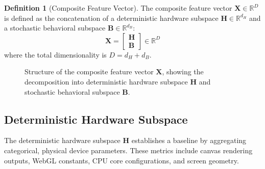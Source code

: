 \documentclass[11pt,twoside]{amsart}
\theoremstyle{plain}
\theoremstyle{definition}
\newtheorem{definition}[theorem]{Definition}
\theoremstyle{remark}
\newcommand{\bX}{\mathbf{X}}
\newcommand{\bH}{\mathbf{H}}
\newcommand{\bB}{\mathbf{B}}
\newcommand{\bepsilon}{\boldsymbol{\epsilon}}
\newcommand{\bbR}{\mathbb{R}}
\begin{document}
\begin{definition}[Composite Feature Vector]
\label{def:composite}
The composite feature vector $\bX \in \bbR^D$ is defined as the concatenation of a deterministic hardware subspace $\bH \in \bbR^{d_H}$ and a stochastic behavioral subspace $\bB \in \bbR^{d_B}$:
\begin{equation}
\bX = \begin{bmatrix} \bH \\ \bB \end{bmatrix} \in \bbR^D
\end{equation}
where the total dimensionality is $D = d_H + d_B$.
\end{definition}

\begin{figure}[htbp]
\centering
{}
\caption{Structure of the composite feature vector $\bX$, showing the decomposition into deterministic hardware subspace $\bH$ and stochastic behavioral subspace $\bB$.}
\label{fig:composite}
\end{figure}

\subsection{Deterministic Hardware Subspace}

The deterministic hardware subspace $\bH$ establishes a baseline by aggregating categorical, physical device parameters. These metrics include canvas rendering outputs, WebGL constants, CPU core configurations, and screen geometry.
\end{document}
